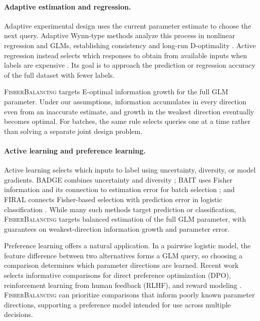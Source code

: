\documentclass[10pt,twoside,letterpaper]{article}
\newcommand{\FB}{\textnormal{\textsc{FisherBalancing}}}
\begin{document}
\paragraph{Adaptive estimation and regression.}
Adaptive experimental design uses the current parameter estimate to
choose the next query. Adaptive Wynn-type methods analyze this
process in nonlinear regression and GLMs, establishing consistency and
long-run D-optimality \cite{Freise2021,Freise2024}. Active regression
instead selects which responses to obtain from available inputs when
labels are expensive \cite{ChenPrice2019,ChenLiSun2022}. Its goal is to
approach the prediction or regression accuracy of the full dataset with
fewer labels.

\FB{} targets E-optimal information growth for the full GLM parameter.
Under our assumptions, information accumulates in every direction even
from an inaccurate estimate, and growth in the weakest direction
eventually becomes optimal. For batches, the same rule selects queries
one at a time rather than solving a separate joint design problem.

\paragraph{Active learning and preference learning.}
Active learning selects which inputs to label using uncertainty, diversity,
or model gradients. BADGE combines uncertainty and diversity
\cite{Ash2020}; BAIT uses Fisher information and its connection to
estimation error for batch selection \cite{Ash2021}; and FIRAL connects
Fisher-based selection with prediction error in logistic classification
\cite{ChenBiros2023}. While many such methods target prediction or
classification, \FB{} targets balanced estimation of the full GLM
parameter, with guarantees on weakest-direction information growth and
parameter error.

Preference learning offers a natural application. In a pairwise logistic
model, the feature difference between two alternatives forms a GLM query,
so choosing a comparison determines which parameter directions are
learned. Recent work selects informative comparisons for direct preference
optimization (DPO), reinforcement learning from human feedback (RLHF),
and reward modeling \cite{Muldrew2024,Das2025,Shen2025}.
\FB{} can prioritize comparisons that inform poorly known parameter
directions, supporting a preference model intended for use across
multiple decisions.
\end{document}
